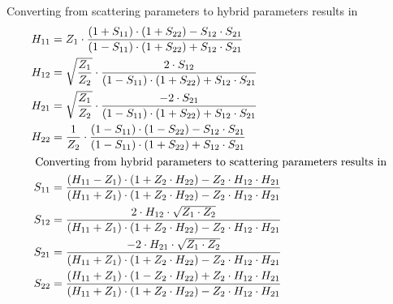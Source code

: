Converting from scattering parameters to hybrid parameters results in
\begin{align}
H_{11} &= Z_{1}\cdot \dfrac{\left(1 + S_{11}\right)\cdot \left(1 + S_{22}\right) - S_{12}\cdot S_{21}}{\left(1 - S_{11}\right)\cdot \left(1 + S_{22}\right) + S_{12}\cdot S_{21}}\\
H_{12} &= \sqrt{\dfrac{Z_1}{Z_2}}\cdot \dfrac{2\cdot S_{12}}{\left(1 - S_{11}\right)\cdot \left(1 + S_{22}\right) + S_{12}\cdot S_{21}}\\
H_{21} &= \sqrt{\dfrac{Z_1}{Z_2}}\cdot \dfrac{-2\cdot S_{21}}{\left(1 - S_{11}\right)\cdot \left(1 + S_{22}\right) + S_{12}\cdot S_{21}}\\
H_{22} &= \dfrac{1}{Z_{2}}\cdot \dfrac{\left(1 - S_{11}\right)\cdot \left(1 - S_{22}\right) - S_{12}\cdot S_{21}}{\left(1 - S_{11}\right)\cdot \left(1 + S_{22}\right) + S_{12}\cdot S_{21}}\\
\intertext{
Converting from hybrid parameters to scattering parameters results in
}
S_{11} &= \dfrac{\left(H_{11} - Z_{1}\right)\cdot \left(1 + Z_{2}\cdot H_{22}\right) - Z_2\cdot H_{12}\cdot H_{21}}{\left(H_{11} + Z_{1}\right)\cdot \left(1 + Z_{2}\cdot H_{22}\right) - Z_2\cdot H_{12}\cdot H_{21}}\\
S_{12} &= \dfrac{2\cdot H_{12}\cdot\sqrt{Z_1\cdot Z_2}}{\left(H_{11} + Z_{1}\right)\cdot \left(1 + Z_{2}\cdot H_{22}\right) - Z_2\cdot H_{12}\cdot H_{21}}\\
S_{21} &= \dfrac{-2\cdot H_{21}\cdot\sqrt{Z_1\cdot Z_2}}{\left(H_{11} + Z_{1}\right)\cdot \left(1 + Z_{2}\cdot H_{22}\right) - Z_2\cdot H_{12}\cdot H_{21}}\\
S_{22} &= \dfrac{\left(H_{11} + Z_{1}\right)\cdot \left(1 - Z_{2}\cdot H_{22}\right) + Z_2\cdot H_{12}\cdot H_{21}}{\left(H_{11} + Z_{1}\right)\cdot \left(1 + Z_{2}\cdot H_{22}\right) - Z_2\cdot H_{12}\cdot H_{21}}
\end{align}

